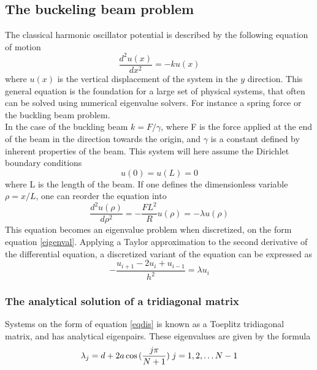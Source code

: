 \documentclass[%
reprint,
amsmath, 
amssymb, 
aps,]{revtex4-1}
\begin{document}
		\subsection{The buckeling beam problem} \noindent 
The classical harmonic oscillator potential is described by the following equation of motion
			\begin{equation}\label{evp}
\frac{d^2 u(x)}{dx^2} = -k u(x)
			\end{equation}
where $u(x)$ is the vertical displacement of the system in the $y$ direction. This general equation is the foundation for a large set of physical systems, that often can be solved using numerical eigenvalue solvers. For instance a spring force or the buckling beam problem. \\ \indent 
 In the case of the buckling beam $k = F/\gamma$, where F is the force applied at the end of the beam in the direction towards the origin, and $\gamma$ is a constant defined by inherent properties of the beam. This system will here assume the Dirichlet boundary conditions
 			\begin{equation*}
 	u(0) = u(L) = 0
			\end{equation*}
where L is the length of the beam. If one defines the dimensionless variable $\rho = x/L$, one can reorder the equation into
			\begin{equation}\label{bb}
\frac{d^2 u(\rho)}{d\rho^2} = -\frac{FL^2}{R} u(\rho)=-\lambda u(\rho)
			\end{equation}
This equation becomes an eigenvalue problem when discretized, on the form equation \ref{eigenval}. Applying a Taylor approximation to the second derivative of the differential equation, a discretized variant of the equation can be expressed as
			\begin{equation}\label{eqdis}
-\frac{u_{i+1} -2u_i +u_{i-1} }{h^2}  = \lambda u_i
			\end{equation}


		\subsubsection{The analytical solution of a tridiagonal matrix} \noindent 
Systems on the form of equation \ref{eqdis} is known as a Toeplitz tridiagonal matrix, and has analytical eigenpairs. These eigenvalues are given by the formula
			\begin{equation}\label{analytical}
\lambda_j = d+2a\cos{(\frac{j\pi}{N+1})} \hspace{0.1cm} j=1,2,\dots N-1
			\end{equation}
\end{document}
